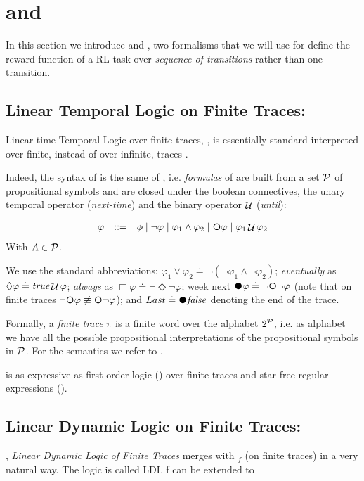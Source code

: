 \section{\LTLf and \LDLf}
In this section we introduce \LTLf and \LDLf, two formalisms that we will use for define the reward function of a RL task over \emph{sequence of transitions} rather than one transition.

\subsection{Linear Temporal Logic on Finite Traces: \LTLf}
Linear-time Temporal Logic over finite traces, \LTLf, is essentially standard 
\LTL \citep{Pnueli:1977:TLP:1382431.1382534} interpreted over finite, instead of over infinite, traces \citep{de2013linear}.

Indeed, the syntax of \LTLf is the same of \LTLf, i.e. \emph{formulas} of \LTLf are built from a set $\mathcal{P}$ of propositional symbols and are closed under the boolean connectives, the unary temporal operator \Next (\emph{next-time}) and the binary operator $\mathop{\mathcal{U}}$ (\emph{until}):

\[\begin{array}{rcl}
\varphi &::=& \phi \mid \lnot \varphi \mid \varphi_1\land \varphi_2 \mid \Next\varphi \mid \varphi_1 \Until \varphi_2
\end{array}
\]
With $A\in \mathcal{P}$.

We use the standard abbreviations:
$\varphi_1\lor\varphi_2 \doteq \lnot(\lnot \varphi_1\land \lnot
\varphi_2)$;
\emph{eventually} as $\Diamond\varphi \doteq \mathit{true}\mathop{\mathcal{U}}\varphi$;
\emph{always} as $\Box\varphi \doteq\lnot\Diamond\lnot\varphi$; 
week next $\Wnext\varphi \doteq \lnot\Next\lnot\varphi$ (note that on finite
traces $\lnot\Next\varphi \not\equiv \Next\lnot\varphi$); and $Last \doteq \Wnext\false$ denoting the end of the trace. 

Formally, a \emph{finite trace} $\pi$ is a finite word over the alphabet $2^{\mathcal{P}}$, i.e. as alphabet we have all the possible propositional interpretations of the propositional symbols in $\mathcal{P}$. For the semantics we refer to \citep{de2013linear}.

\LTLf is as expressive as 
first-order logic (\FO)
over finite traces
and star-free regular expressions (\REGEX).

\subsection{Linear Dynamic Logic on Finite Traces: \LDLf}
\LDLf, \emph{Linear Dynamic Logic of Finite Traces} merges \LTLf with \REGEX$_f$ (\REGEX on finite traces) in a very natural way.
The logic is called LDL f
\LTLf can be extended to 


